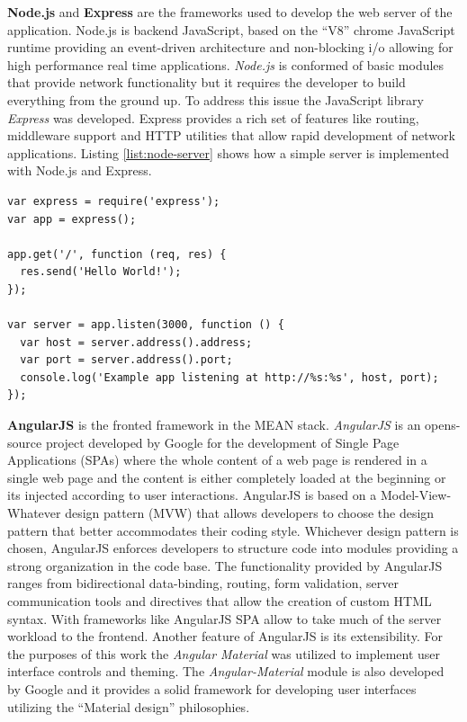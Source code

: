 \documentclass[../medieninformatik-arbeit.tex]{subfiles}
\begin{document}
\textbf{Node.js}\cite{joyent2015node} and \textbf{Express}\cite{express} are the frameworks used to develop the web server of the application. Node.js is backend JavaScript, based on the ``V8'' chrome JavaScript runtime providing an event-driven architecture and non-blocking i/o allowing for high performance real time applications. \textit{Node.js} is conformed of basic modules that provide network functionality but it requires the developer to build everything from the ground up. To address this issue the JavaScript library \textit{Express} was developed. Express provides a rich set of features like routing, middleware support and HTTP utilities that allow rapid development of network applications. Listing \ref{list:node-server} shows how a simple server is implemented with Node.js and Express.

\begin{lstlisting}[style=htmlcssjs, caption={Basic Node.js and Express server example},label=list:node-server]
var express = require('express');
var app = express();

app.get('/', function (req, res) {
  res.send('Hello World!');
});

var server = app.listen(3000, function () {
  var host = server.address().address;
  var port = server.address().port;
  console.log('Example app listening at http://%s:%s', host, port);
});
\end{lstlisting}

\textbf{AngularJS}\cite{angular} is the fronted framework in the MEAN stack. \textit{AngularJS} is an opens-source project developed by Google for the development of Single Page Applications (SPAs) where the whole content of a web page is rendered in a single web page and the content is either completely loaded at the beginning or its injected according to user interactions. AngularJS is based on a Model-View-Whatever design pattern (MVW) that allows developers to choose the design pattern that better accommodates their coding style. Whichever design pattern is chosen, AngularJS enforces developers to structure code into modules providing a strong organization in the code base. The functionality provided by AngularJS ranges from bidirectional data-binding, routing, form validation, server communication tools and directives that allow the creation of custom HTML syntax. With frameworks like AngularJS SPA allow to take much of the server workload to the frontend. Another feature of AngularJS is its extensibility. For the purposes of this work the \textit{Angular Material}\cite{angularmaterial} was utilized to implement user interface controls and theming. The \textit{Angular-Material} module is also developed by Google and it provides a solid framework for developing user interfaces utilizing the ``Material design'' philosophies. 
\end{document}
